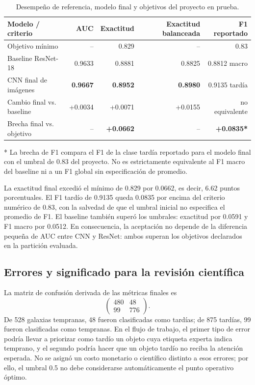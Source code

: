 \documentclass[letterpaper,11pt]{article}
\begin{document}
\begin{table}[H]
\centering
\caption{Desempeño de referencia, modelo final y objetivos del proyecto en prueba.}
\label{tab:resultados}
\begin{tabularx}{\linewidth}{>{\raggedright\arraybackslash}Xrrrr}
\toprule
Modelo / criterio & AUC & Exactitud & Exactitud balanceada & F1 reportado\\
\midrule
Objetivo mínimo & -- & 0.829 & -- & 0.83\\
Baseline ResNet-18 & 0.9633 & 0.8881 & 0.8825 & 0.8812 macro\\
CNN final de imágenes & \textbf{0.9667} & \textbf{0.8952} & \textbf{0.8980} & 0.9135 tardía\\
\midrule
Cambio final vs. baseline & +0.0034 & +0.0071 & +0.0155 & no equivalente\\
Brecha final vs. objetivo & -- & \textbf{+0.0662} & -- & \textbf{+0.0835*}\\
\bottomrule
\end{tabularx}

\vspace{0.3em}
\footnotesize{* La brecha de F1 compara el F1 de la clase tardía reportado para el modelo final con el umbral de 0.83 del proyecto. No es estrictamente equivalente al F1 macro del baseline ni a un F1 global sin especificación de promedio.}
\end{table}

La exactitud final excedió el mínimo de 0.829 por 0.0662, es decir, 6.62 puntos porcentuales. El F1 tardío de 0.9135 queda 0.0835 por encima del criterio numérico de 0.83, con la salvedad de que el umbral inicial no especifica el promedio de F1. El baseline también superó los umbrales: exactitud por 0.0591 y F1 macro por 0.0512. En consecuencia, la aceptación no depende de la diferencia pequeña de AUC entre CNN y ResNet: ambos superan los objetivos declarados en la partición evaluada.

\subsection{Errores y significado para la revisión científica}

La matriz de confusión derivada de las métricas finales es
\[
\begin{pmatrix}
480 & 48\\
99 & 776
\end{pmatrix}.
\]
De 528 galaxias tempranas, 48 fueron clasificadas como tardías; de 875 tardías, 99 fueron clasificadas como tempranas. En el flujo de trabajo, el primer tipo de error podría llevar a priorizar como tardío un objeto cuya etiqueta experta indica temprano, y el segundo podría hacer que un objeto tardío no reciba la atención esperada. No se asignó un costo monetario o científico distinto a esos errores; por ello, el umbral 0.5 no debe considerarse automáticamente el punto operativo óptimo.
\end{document}
